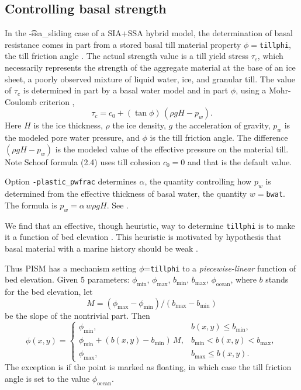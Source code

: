  

\subsection{Controlling basal strength}  \label{subsect:basestrength}

In the \t{-ssa_sliding} case of a SIA+SSA hybrid model, the determination of basal resistance comes in part from a stored basal till material property $\phi=$\texttt{tillphi}, the till friction angle \cite{Paterson}.  The actual strength value is a till yield stress $\tau_c$, which necessarily represents the strength of the aggregate material at the base of an ice sheet, a poorly observed mixture of liquid water, ice, and granular till.  The value of $\tau_c$ is determined in part by a basal water model and in part $\phi$, using a Mohr-Coulomb criterion \cite[Chapter 8]{Paterson}, 
\begin{equation*}
   \tau_c = c_{0} + (\tan\phi)\,(\rho g H - p_w).
\end{equation*}
Here $H$ is the ice thickness, $\rho$ the ice density, $g$ the acceleration of gravity, $p_w$ is the modeled pore water pressure, and $\phi$ is the till friction angle.  The difference $(\rho g H - p_w)$ is the modeled value of the effective pressure on the material till.  Note Schoof \cite{SchoofStream} formula (2.4) uses till cohesion $c_0 = 0$ and that is the default value.

Option \texttt{-plastic_pwfrac} determines $\alpha$, the quantity controlling how $p_w$ is determined from the effective thickness of basal water, the quantity $w=$\texttt{bwat}.  The formula is $p_w = \alpha\, w \rho g H$.  See \cite{BKAJS}.

We find that an effective, though heuristic, way to determine \texttt{tillphi} is to make it a function of bed elevation \cite{BKAJS}.  This heuristic is motivated by hypothesis that basal material with a marine history should be weak \cite{HuybrechtsdeWolde}.

Thus PISM has a mechanism setting $\phi$=\texttt{tillphi} to a \emph{piecewise-linear} function of bed elevation.  Given 5 parameters: $\phi_{\mathrm{min}}$, $\phi_{\mathrm{max}}$, $b_{\mathrm{min}}$, $b_{\mathrm{max}}$, $\phi_{\mathrm{ocean}}$, where $b$ stands for the bed elevation, let 
\begin{equation}
  M = (\phi_{\text{max}} - \phi_{\text{min}}) / (b_{\text{max}} - b_{\text{min}})\label{eq:1}
\end{equation}
be the slope of the nontrivial part.  Then
\begin{equation}
  \phi(x,y) = \begin{cases}
    \phi_{\text{min}}, & b(x,y) \le b_{\text{min}}, \\
    \phi_{\text{min}} + (b(x,y) - b_{\text{min}}) \,M,
    &  b_{\text{min}} < b(x,y) < b_{\text{max}}, \\
    \phi_{\text{max}}, & b_{\text{max}} \le b(x,y). \end{cases}\label{eq:2}
\end{equation}
The exception is if the point is marked as floating, in which case the till friction angle
is set to the value $\phi_{\mathrm{ocean}}$.

